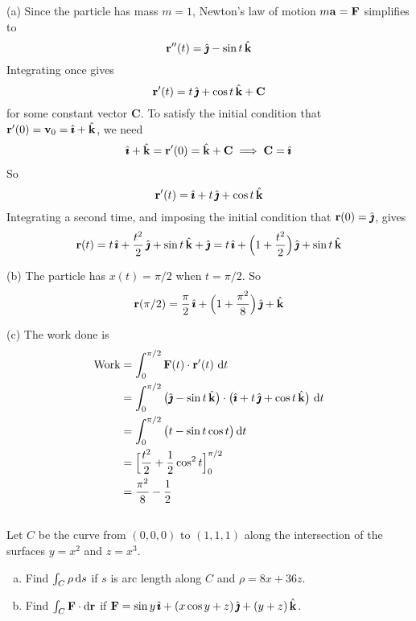 \begin{solution}
(a) Since the particle has mass $m=1$, Newton's law of motion 
$m\mathbf{a}=\mathbf{F}$ simplifies to
\begin{equation*}
\mathbf{r}''(t) = \hat{\pmb{\jmath}} - \sin t\,\hat{\mathbf{k}}
\end{equation*}
Integrating once gives
\begin{equation*}
\mathbf{r}'(t) = t\,\hat{\pmb{\jmath}} + \cos t\,\hat{\mathbf{k}} + \mathbf{C}
\end{equation*}
for some constant vector $\mathbf{C}$.
To satisfy the initial condition that $\mathbf{r}'(0) = \mathbf{v}_0=\hat{\pmb{\imath}}+\hat{\mathbf{k}}$, 
we need
\begin{align*}
\hat{\pmb{\imath}}+\hat{\mathbf{k}} = \mathbf{r}'(0) = \hat{\mathbf{k}} + \mathbf{C}
\implies \mathbf{C} = \hat{\pmb{\imath}}
\end{align*}
So
\begin{equation*}
\vr'(t) %
        = \hi + t\,\hj + \cos t\,\hk 
\end{equation*}
Integrating a second time, and imposing the initial condition that $\mathbf{r}(0)
=\hat{\pmb{\jmath}}$, gives
\begin{equation*}
\mathbf{r}(t)  = t\,\hat{\pmb{\imath}} + \frac{t^2}{2}\,\hat{\pmb{\jmath}} + \sin t\,\hat{\mathbf{k}} +\hat{\pmb{\jmath}}
        = t\,\hat{\pmb{\imath}} +\Big(1+\frac{t^2}{2}\Big)\,\hat{\pmb{\jmath}} + \sin t\,\hat{\mathbf{k}}
\end{equation*}

(b) The particle has $x(t) =\pi/2$ when $t=\pi/2$. So
\begin{equation*}
\mathbf{r}(\pi/2) = \frac{\pi}{2}\,\hat{\pmb{\imath}}  +\Big(1+\frac{\pi^2}{8}\Big)\,\hat{\pmb{\jmath}} + \hat{\mathbf{k}}
\end{equation*}

(c) The work done is
\begin{align*}
\text{Work} &= \int_0^{\pi/2} \mathbf{F}(t)\cdot\mathbf{r}'(t)\ \mathrm{d}t \\
  &= \int_0^{\pi/2} \big(\hat{\pmb{\jmath}} - \sin t\,\hat{\mathbf{k}}\big)\cdot
         \big(\hat{\pmb{\imath}} + t\,\hat{\pmb{\jmath}} + \cos t\,\hat{\mathbf{k}}\big)\ \mathrm{d}t \\
  &= \int_0^{\pi/2} \big(t-\sin t\cos t\big)\,\mathrm{d}t \\
  &= \Big[\frac{t^2}{2} +\frac{1}{2}\cos^2 t\Big]_0^{\pi/2} \\
  & = \frac{\pi^2}{8}-\frac{1}{2}
\end{align*}
\end{solution}


\subsection*{\Application}

\begin{question}
Let $C$ be the curve from $(0,0,0)$ to $(1,1,1)$ along the 
intersection of the surfaces $y=x^2$ and $z=x^3$.
\begin{enumerate}[(a)]
\item
Find $\int_C \rho\, \mathrm{d}s$ if $s$ is arc length along $C$ and $\rho=8x+36z$.
\item
Find $\int_C \mathbf{F}\cdot \mathrm{d}\mathbf{r}$ if
 $\mathbf{F}=\sin y\,\hat{\pmb{\imath}} + (x\cos y+z)\,\hat{\pmb{\jmath}}+ (y+z)\,\hat{\mathbf{k}}$.
\end{enumerate}
\end{question}

